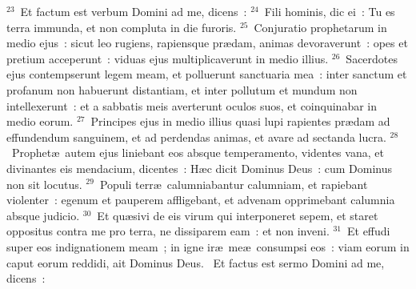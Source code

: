 ${}^{23}$~Et factum est verbum Domini ad me, dicens~:
${}^{24}$~Fili hominis, dic ei~: Tu es terra immunda, et non compluta in die furoris.
${}^{25}$~Conjuratio prophetarum in medio ejus~: sicut leo rugiens, rapiensque pr\ae dam, animas devoraverunt~: opes et pretium acceperunt~: viduas ejus multiplicaverunt in medio illius.
${}^{26}$~Sacerdotes ejus contempserunt legem meam, et polluerunt sanctuaria mea~: inter sanctum et profanum non habuerunt distantiam, et inter pollutum et mundum non intellexerunt~: et a sabbatis meis averterunt oculos suos, et coinquinabar in medio eorum.
${}^{27}$~Principes ejus in medio illius quasi lupi rapientes pr\ae dam ad effundendum sanguinem, et ad perdendas animas, et avare ad sectanda lucra.
${}^{28}$~Prophet\ae\ autem ejus liniebant eos absque temperamento, videntes vana, et divinantes eis mendacium, dicentes~: H\ae c dicit Dominus Deus~: cum Dominus non sit locutus.
${}^{29}$~Populi terr\ae\ calumniabantur calumniam, et rapiebant violenter~: egenum et pauperem affligebant, et advenam opprimebant calumnia absque judicio.
${}^{30}$~Et qu\ae sivi de eis virum qui interponeret sepem, et staret oppositus contra me pro terra, ne dissiparem eam~: et non inveni.
${}^{31}$~Et effudi super eos indignationem meam~; in igne ir\ae\ me\ae\ consumpsi eos~: viam eorum in caput eorum reddidi, ait Dominus Deus.
~Et factus est sermo Domini ad me, dicens~:
